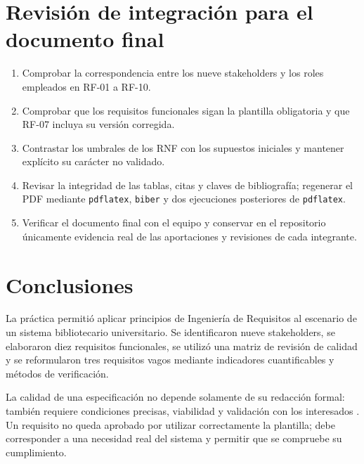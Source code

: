 \documentclass[conference,onecolumn]{IEEEtran}
\begin{document}
\section{Revisión de integración para el documento final}
\begin{enumerate}
\item Comprobar la correspondencia entre los nueve stakeholders y los roles empleados en RF-01 a RF-10.
\item Comprobar que los requisitos funcionales sigan la plantilla obligatoria y que RF-07 incluya su versión corregida.
\item Contrastar los umbrales de los RNF con los supuestos iniciales y mantener explícito su carácter no validado.
\item Revisar la integridad de las tablas, citas y claves de bibliografía; regenerar el PDF mediante \texttt{pdflatex}, \texttt{biber} y dos ejecuciones posteriores de \texttt{pdflatex}.
\item Verificar el documento final con el equipo y conservar en el repositorio únicamente evidencia real de las aportaciones y revisiones de cada integrante.
\end{enumerate}

\section{Conclusiones}
La práctica permitió aplicar principios de Ingeniería de Requisitos al escenario de un sistema bibliotecario universitario. Se identificaron nueve stakeholders, se elaboraron diez requisitos funcionales, se utilizó una matriz de revisión de calidad y se reformularon tres requisitos vagos mediante indicadores cuantificables y métodos de verificación.

La calidad de una especificación no depende solamente de su redacción formal: también requiere condiciones precisas, viabilidad y validación con los interesados \cite{ieee29148,swebok2024}. Un requisito no queda aprobado por utilizar correctamente la plantilla; debe corresponder a una necesidad real del sistema y permitir que se compruebe su cumplimiento.

\printbibliography[title={Referencias}]
\end{document}
